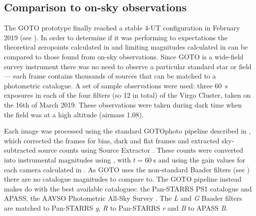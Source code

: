 \begin{colsection}
\begin{colsection}
\end{colsection}

\newpage
\subsection{Comparison to on-sky observations}
\label{sec:onsky_comparison}
\begin{colsection}

The GOTO prototype finally reached a stable 4-UT configuration in February 2019 (see ). In order to determine if it was performing to expectations the theoretical zeropoints calculated in  and limiting magnitudes calculated in  can be compared to those found from on-sky observations. Since GOTO is a wide-field survey instrument there was no need to observe a particular standard star or field --- each frame contains thousands of sources that can be matched to a photometric catalogue. A set of sample observations were used: three \SI{60}{\second} exposures in each of the four filters (so 12 in total) of the Virgo Cluster, taken on the 16th of March 2019. These observations were taken during dark time when the field was at a high altitude (airmass 1.08).

Each image was processed using the standard GOTOphoto pipeline described in , which corrected the frames for bias, dark and flat frames and extracted sky-subtracted source counts using Source Extractor \citep{SE}. These counts were converted into instrumental magnitudes using , with $t=\SI{60}{\second}$ and using the gain values for each camera calculated in . As GOTO uses the non-standard Baader filters (see ) there are no catalogue magnitudes to compare to. The GOTO pipeline instead makes do with the best available catalogues: the Pan-STARRS PS1 catalogue \citep{Pan-STARRS} and APASS, the AAVSO Photometric All-Sky Survey \citep{APASS}. The \textit{L} and \textit{G} Baader filters are matched to Pan-STARRS \textit{g}, \textit{R} to Pan-STARRS \textit{r} and \textit{B} to APASS \textit{B}.

\newpage


\end{colsection}
\end{colsection}
